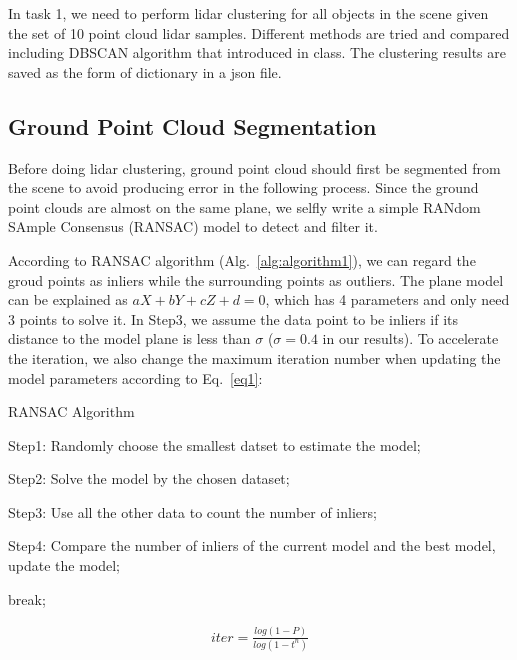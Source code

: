 \documentclass[10pt]{article}
\theoremstyle{nonumberplain}
\begin{document}
In task 1, we need to perform lidar clustering for all objects in the scene given the set of 10 point cloud lidar samples. Different methods are tried and compared including DBSCAN algorithm that introduced in class. The clustering results are saved as the form of dictionary in a json file.

\subsection{Ground Point Cloud Segmentation}

\hspace{1.0em}
Before doing lidar clustering, ground point cloud should first be segmented from the scene to avoid producing error in the following process. Since the ground point clouds are almost on the same plane, we selfly write a simple RANdom SAmple Consensus (RANSAC) model to detect and filter it. 

According to RANSAC algorithm (Alg.~\ref{alg:algorithm1}), we can regard the groud points as inliers while the surrounding points as outliers. The plane model can be explained as $aX+bY+cZ+d=0$, which has 4 parameters and only need 3 points to solve it. In Step3, we assume the data point to be inliers if its distance to the model plane is less than $\sigma$ ($\sigma=0.4$ in our results). To accelerate the iteration, we also change the maximum iteration number when updating the model parameters according to Eq.~\ref{eq1}:

\begin{algorithm}
	\caption{RANSAC Algorithm}
	\begin{algorithmic}  
		
			\STATE Step1: Randomly choose the smallest datset to estimate the model;
			
			\STATE Step2: Solve the model by the chosen dataset;
			
			\STATE Step3: Use all the other data to count the number of inliers;
			
			\STATE Step4: Compare the number of inliers of the current model and the best model, update the model;
			
				\STATE break;
			\ENDIF 
		
		\ENDWHILE
		
	\end{algorithmic}
 \label{alg:algorithm1} 
\end{algorithm}

\begin{equation}
\begin{aligned}
	iter = \frac{log(1-P)}{log(1-t^{n})}
	\label{eq1}
\end{aligned}
\end{equation}
\end{document}
